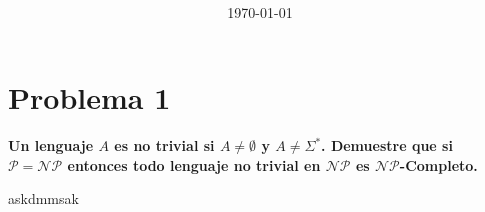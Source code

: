 \documentclass[spanish]{article}
\title{\task \\ {\normalsize \class \\ \institution \\}}
\author{\me}
\date{\today}
\begin{document}
\maketitle
\newpage
\tableofcontents
\newpage

\section{Problema 1}
\textbf{Un lenguaje $A$ es no trivial si $A\neq\emptyset$ y $A\neq\Sigma^{*}$. Demuestre que si $\mathcal{P} = \mathcal{NP}$ entonces todo lenguaje no trivial en $\mathcal{NP}$ es $\mathcal{NP}$-Completo.}

askdmmsak
\end{document}

